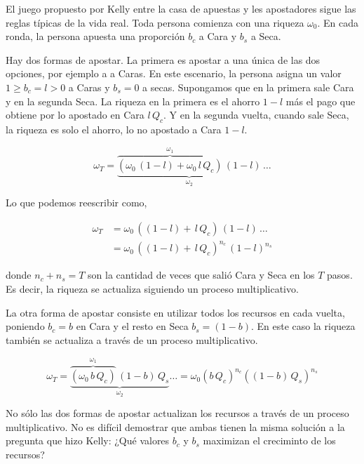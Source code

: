 \documentclass[a4paper,10pt]{book}
\theoremstyle{definition}
\begin{document}

El juego propuesto por Kelly entre la casa de apuestas y les apostadores sigue las reglas típicas de la vida real.
%
Toda persona comienza con una riqueza $\omega_0$.
%
En cada ronda, la persona apuesta una proporción $b_c$ a Cara y $b_s$ a Seca.


Hay dos formas de apostar.
%
La primera es apostar a una única de las dos opciones, por ejemplo a a Caras.
%
En este escenario, la persona asigna un valor $ 1 \geq b_c = l > 0 $ a Caras y $b_s = 0$ a secas.
%
Supongamos que en la primera sale Cara y en la segunda Seca.
%
La riqueza en la primera es el ahorro $1-l$ más el pago que obtiene por lo apostado en Cara $l \, Q_c$.
%
Y en la segunda vuelta, cuando sale Seca, la riqueza es solo el ahorro, lo no apostado a Cara $1-l$.
%

\begin{equation}
\omega_T = \underbrace{\overbrace{(\omega_0 \, (1-l) + \omega_0 \, l \, Q_c )}^{\omega_1} \, (1-l)}_{\omega_2} \,\dots
\end{equation}

Lo que podemos reescribir como,

\begin{equation}
\begin{split}
\omega_T &= \omega_0 \, ((1-l) + \, l \, Q_c ) \, (1-l) \, \dots \\
 &= \omega_0 \, ( (1-l) + \, l \, Q_c )^{n_c} \, (1-l)^{n_s} 
\end{split}
\end{equation}

donde $n_c + n_s = T$ son la cantidad de veces que salió Cara y Seca en los $T$ pasos.
%
Es decir, la riqueza se actualiza siguiendo un proceso multiplicativo.


La otra forma de apostar consiste en utilizar todos los recursos en cada vuelta, poniendo $b_c = b$ en Cara y el resto en Seca $b_s = (1-b)$.
%
En este caso la riqueza también se actualiza a través de un proceso multiplicativo.

\begin{equation} \label{eq:kelly_paraconsistente}
\omega_T = \underbrace{\overbrace{(\omega_0 \, b \, Q_c)}^{\omega_1} \,  (1-b) \, Q_s}_{\omega_2} \dots = \omega_0 (b \, Q_c)^{n_c} ((1-b) \, Q_s )^{n_s}
\end{equation}

No sólo las dos formas de apostar actualizan los recursos a través de un proceso multiplicativo.
%
No es difícil demostrar que ambas tienen la misma solución a la pregunta que hizo Kelly: ¿Qué valores $b_c$ y $b_s$ maximizan el creciminto de los recursos?
\end{document}
